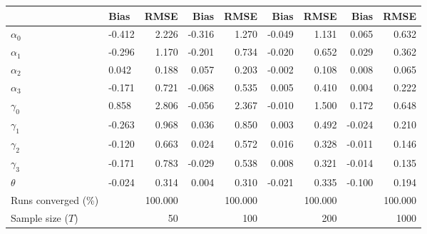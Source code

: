 
\begin{tabular}[t]{llrrrrrrr}
\toprule
  & Bias & RMSE & Bias & RMSE & Bias & RMSE & Bias & RMSE\\
\midrule
$\alpha_{0}$ & -0.412 & 2.226 & -0.316 & 1.270 & -0.049 & 1.131 & 0.065 & 0.632\\
$\alpha_{1}$ & -0.296 & 1.170 & -0.201 & 0.734 & -0.020 & 0.652 & 0.029 & 0.362\\
$\alpha_{2}$ & 0.042 & 0.188 & 0.057 & 0.203 & -0.002 & 0.108 & 0.008 & 0.065\\
$\alpha_{3}$ & -0.171 & 0.721 & -0.068 & 0.535 & 0.005 & 0.410 & 0.004 & 0.222\\
$\gamma_{0}$ & 0.858 & 2.806 & -0.056 & 2.367 & -0.010 & 1.500 & 0.172 & 0.648\\
$\gamma_{1}$ & -0.263 & 0.968 & 0.036 & 0.850 & 0.003 & 0.492 & -0.024 & 0.210\\
$\gamma_{2}$ & -0.120 & 0.663 & 0.024 & 0.572 & 0.016 & 0.328 & -0.011 & 0.146\\
$\gamma_{3}$ & -0.171 & 0.783 & -0.029 & 0.538 & 0.008 & 0.321 & -0.014 & 0.135\\
$\theta$ & -0.024 & 0.314 & 0.004 & 0.310 & -0.021 & 0.335 & -0.100 & 0.194\\
Runs converged (\%) &  & 100.000 &  & 100.000 &  & 100.000 &  & 100.000\\
Sample size ($T$) &  & 50 &  & 100 &  & 200 &  & 1000\\
\bottomrule
\end{tabular}
